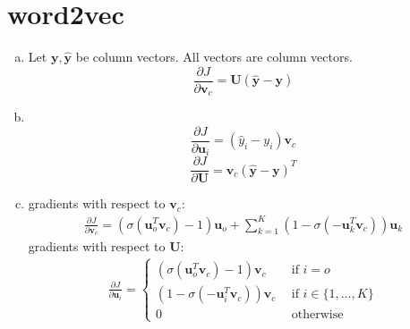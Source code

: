 \documentclass[11pt]{article}
\newcommand{\pder}[2][]{\frac{\partial#1}{\partial#2}}
\begin{document}
\section{word2vec}
\label{sec:3}

\begin{enumerate}[(a)]
\item Let $\bm{y}, \hat{\bm{y}}$ be column vectors. All vectors are column vectors.
  \[
    \pder[J]{\bm{v}_c} = \bm{U}(\hat{\bm{y}} - \bm{y})
  \]
  
\item \
  \[
    \pder[J]{\bm{u}_i} = (\hat{y}_i - y_i)\bm{v}_c
  \]
  \[
    \pder[J]{\bm{U}} = \bm{v}_c(\hat{\bm{y}} - \bm{y})^T
  \]
  
\item gradients with respect to $\bm{v}_c$:
  \begin{align*}
    \pder[J]{\bm{v}_c} = (\sigma(\bm{u}_o^T\bm{v}_c) - 1)\bm{u}_o + \sum_{k=1}^K (1 - \sigma(-\bm{u}_k^T\bm{v}_c))\bm{u}_k
  \end{align*}
  gradients with respect to $\bm{U}$:
  \begin{align*}
    \pder[J]{\bm{u}_i} =
    \begin{cases}
      (\sigma(\bm{u}_o^T\bm{v}_c) - 1)\bm{v}_c \ \ &\mbox{if } i = o \\
       (1 - \sigma(-\bm{u}_i^T\bm{v}_c))\bm{v}_c \ \ &\mbox{if } i \in \{1,\dots, K\} \\
      0 \ \ & \mbox{otherwise}
    \end{cases}
  \end{align*}
  

\end{enumerate}
\end{document}
